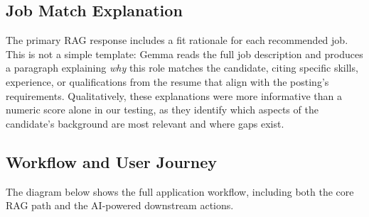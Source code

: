 \documentclass[11pt]{article}
\begin{document}
\subsection{Job Match Explanation}

The primary RAG response includes a fit rationale for each recommended job. This is not a simple template: Gemma reads the full job description and produces a paragraph explaining \textit{why} this role matches the candidate, citing specific skills, experience, or qualifications from the resume that align with the posting's requirements. Qualitatively, these explanations were more informative than a numeric score alone in our testing, as they identify which aspects of the candidate's background are most relevant and where gaps exist.

\subsection{Workflow and User Journey}

The diagram below shows the full application workflow, including both the core RAG path and the AI-powered downstream actions.
\end{document}
